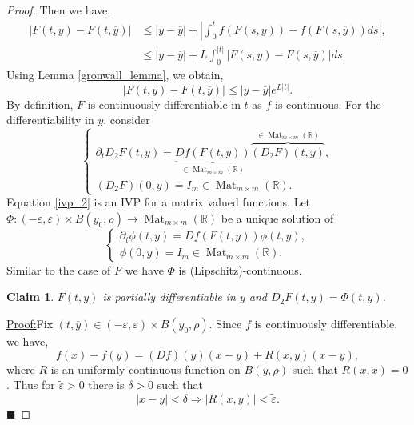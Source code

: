 \documentclass[8pt]{article}
\newtheorem{claim}{Claim}
\newenvironment{claimproof}[1]{\par\noindent\underline{Proof:}\space#1}{\hfill $\blacksquare$}
\DeclareMathOperator{\Mat}{Mat}
\newcommand{\R}[0]{\mathbb{R}}
\begin{document}
\begin{proof}
Then we have,
\begin{align*}
  \vert F(t,y)-F(t,\overline{y})\vert&\leq \vert y -\overline{y}\vert + \left\vert \int_0^tf(F(s,y))-f(F(s,\overline{y}))ds\right\vert,\\
  &\leq \vert y-\overline{y}\vert+L\int_0^{\vert t \vert}\vert F(s,y)-F(s,\overline{y})\vert ds.
\end{align*}
Using Lemma \ref{gronwall_lemma}, we obtain,
\begin{equation*}
  \vert F(t,y)-F(t,\overline{y})\vert\leq \vert y -\overline{y}\vert e^{L\vert t\vert}.
\end{equation*}
By definition, $F$ is continuously differentiable in $t$ as $f$ is continuous. For the differentiability in $y$, consider 
\begin{equation*}
  \begin{cases}
    \partial_t D_2F(t,y) = \underbrace{Df(F(t,y))}_{\in\Mat_{m\times m}(\R)}\overbrace{(D_2F)(t,y)}^{\in\Mat_{m\times m}(\R)},\\
    (D_2F)(0,y) = I_m\in \Mat_{m\times m}(\R).
  \end{cases}
  \tag{P2}
  \label{ivp_2}
\end{equation*}
Equation \eqref{ivp_2} is an IVP for a matrix valued functions. Let $\Phi:(-\varepsilon,\varepsilon)\times B(y_0,\rho)\to\Mat_{m\times m}(\R)$ be a unique solution of 
\begin{equation*}
  \begin{cases}
    \partial_t\phi(t,y) = Df(F(t,y))\phi(t,y),\\
    \phi(0,y) = I_m\in \Mat_{m\times m}(\R).
  \end{cases}
  \tag{P3}
  \label{ivp_3}
\end{equation*}
Similar to the case of $F$ we have $\Phi$ is (Lipschitz)-continuous.
\begin{claim}
  $F(t,y)$ is partially differentiable in $y$ and $D_2F(t,y) = \Phi(t,y)$.
\end{claim}
\begin{claimproof}
Fix $(t,\overline{y})\in(-\varepsilon,\varepsilon)\times B(y_0,\rho)$. Since $f$ is continuously differentiable, we have,
\begin{equation*}
  f(x)-f(y) = (Df)(y)(x-y)+R(x,y)(x-y),
\end{equation*}
where $R$ is an uniformly continuous function on $\overline{B(y,\rho)}$ such that $R(x,x)=0$. Thus for $\tilde{\varepsilon}>0$ there is $\delta>0$ such that 
\begin{equation*}
  \vert x-y\vert<\delta\Rightarrow \vert R(x,y)\vert<\tilde{\varepsilon}.

\end{equation*}
\end{claimproof}
\end{proof}
\end{document}
